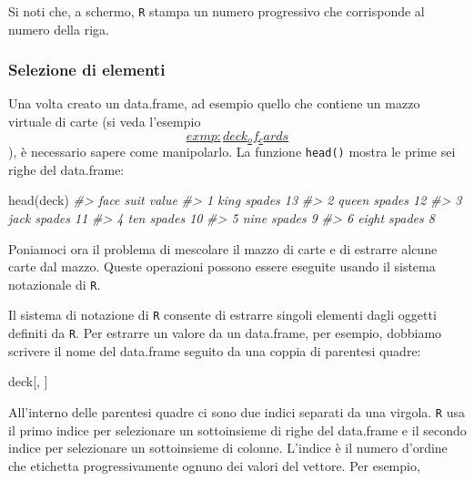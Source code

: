 \documentclass[
  11pt,
]{krantz}
\makeatletter
\newenvironment{Shaded}{\begin{snugshade}}{\end{snugshade}}
\newcommand{\CommentTok}[1]{\textcolor[rgb]{0.37,0.37,0.37}{\textit{#1}}}
\newcommand{\FunctionTok}[1]{\textcolor[rgb]{0,0,0}{#1}}
\newcommand{\NormalTok}[1]{#1}
\newenvironment{kframe}{%
\medskip{}
\setlength{\fboxsep}{.8em}
 \def\at@end@of@kframe{}%
 \ifinner\ifhmode%
  \def\at@end@of@kframe{\end{minipage}}%
  \begin{minipage}{\columnwidth}%
 \fi\fi%
 \def\FrameCommand##1{\hskip\@totalleftmargin \hskip-\fboxsep
 \colorbox{shadecolor}{##1}\hskip-\fboxsep
     \hskip-\linewidth \hskip-\@totalleftmargin \hskip\columnwidth}%
 \MakeFramed {\advance\hsize-\width
   \@totalleftmargin\z@ \linewidth\hsize
   \@setminipage}}%
 {\par\unskip\endMakeFramed%
 \at@end@of@kframe}
\renewenvironment{Shaded}{\begin{kframe}}{\end{kframe}}
\theoremstyle{definition}
\theoremstyle{definition}
\theoremstyle{definition}
\theoremstyle{definition}
\theoremstyle{remark}
\makeatother
\begin{document}
Si noti che, a schermo, \texttt{R} stampa un numero progressivo che corrisponde al numero della riga.

\hypertarget{selezione-di-elementi}{%
\subsubsection{Selezione di elementi}\label{selezione-di-elementi}}

Una volta creato un data.frame, ad esempio quello che contiene un mazzo virtuale di carte (si veda l'esempio~\protect\hyperlink{exmp:deck_of_cards}{\[exmp:deck_of_cards\]}), è necessario sapere come manipolarlo. La funzione \texttt{head()} mostra le prime sei righe del data.frame:

\begin{Shaded}
\begin{Highlighting}[]
\FunctionTok{head}\NormalTok{(deck)}
\CommentTok{\#\textgreater{}    face   suit value}
\CommentTok{\#\textgreater{} 1  king spades    13}
\CommentTok{\#\textgreater{} 2 queen spades    12}
\CommentTok{\#\textgreater{} 3  jack spades    11}
\CommentTok{\#\textgreater{} 4   ten spades    10}
\CommentTok{\#\textgreater{} 5  nine spades     9}
\CommentTok{\#\textgreater{} 6 eight spades     8}
\end{Highlighting}
\end{Shaded}

Poniamoci ora il problema di mescolare il mazzo di carte e di estrarre alcune carte dal mazzo. Queste operazioni possono essere eseguite usando il sistema notazionale di \texttt{R}.

Il sistema di notazione di \texttt{R} consente di estrarre singoli elementi dagli oggetti definiti da \texttt{R}. Per estrarre un valore da un data.frame, per esempio, dobbiamo scrivere il nome del data.frame seguito da una coppia di parentesi quadre:

\begin{Shaded}
\begin{Highlighting}[]
\NormalTok{deck[, ]}
\end{Highlighting}
\end{Shaded}

All'interno delle parentesi quadre ci sono due indici separati da una virgola. \texttt{R} usa il primo indice per selezionare un sottoinsieme di righe del data.frame e il secondo indice per selezionare un sottoinsieme di colonne. L'indice è il numero d'ordine che etichetta progressivamente ognuno dei valori del vettore. Per esempio,
\end{document}
